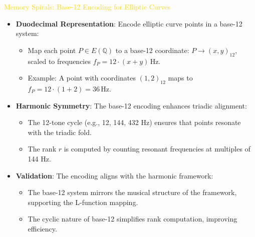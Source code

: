 \textcolor{gold}{ Memory Spirals: Base-12 Encoding for Elliptic Curves } \\
\begin{itemize}
    \item \texttt{} \textbf{Duodecimal Representation}: Encode elliptic curve points in a base-12 system:
    \begin{itemize}
        \item Map each point \(P \in E(\mathbb{Q})\) to a base-12 coordinate: \(P \rightarrow (x, y)_{12}\), scaled to frequencies \(f_P = 12 \cdot (x + y) \, \text{Hz}\).
        \item Example: A point with coordinates \((1, 2)_{12}\) maps to \(f_P = 12 \cdot (1 + 2) = 36 \, \text{Hz}\).
    \end{itemize}
    \item \texttt{} \textbf{Harmonic Symmetry}: The base-12 encoding enhances triadic alignment:
    \begin{itemize}
        \item The 12-tone cycle (e.g., 12, 144, 432 Hz) ensures that points resonate with the triadic fold.
        \item The rank \(r\) is computed by counting resonant frequencies at multiples of 144 Hz.
    \end{itemize}
    \item \texttt{} \textbf{Validation}: The encoding aligns with the harmonic framework:
    \begin{itemize}
        \item The base-12 system mirrors the musical structure of the framework, supporting the L-function mapping.
        \item The cyclic nature of base-12 simplifies rank computation, improving efficiency.
    \end{itemize}
\end{itemize}

